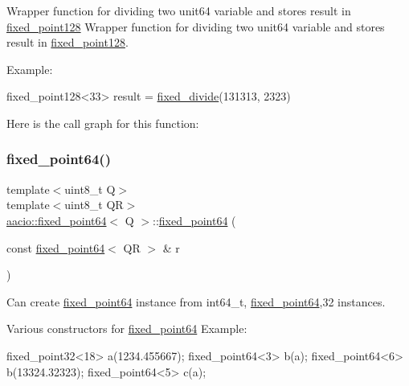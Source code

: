 Wrapper function for dividing two unit64 variable and stores result in \mbox{\hyperlink{structaacio_1_1fixed__point128}{fixed\+\_\+point128}} Wrapper function for dividing two unit64 variable and stores result in \mbox{\hyperlink{structaacio_1_1fixed__point128}{fixed\+\_\+point128}}. 

Example\+: 
\begin{DoxyCode}
fixed\_point128<33> result = \mbox{\hyperlink{group__fixedpoint_ga605ac661acc42c361ed85c4398e880d0}{fixed\_divide}}(131313, 2323)
\end{DoxyCode}
 Here is the call graph for this function\+:
\mbox{\label{group__fixedpoint_ga998ecf508857149cd2782eed7683d327}} 
\subsubsection{\texorpdfstring{fixed\+\_\+point64()}{fixed\_point64()}}
{\footnotesize\ttfamily template$<$uint8\+\_\+t Q$>$ \\
template$<$uint8\+\_\+t QR$>$ \\
\mbox{\hyperlink{structaacio_1_1fixed__point64}{aacio\+::fixed\+\_\+point64}}$<$ Q $>$\+::\mbox{\hyperlink{structaacio_1_1fixed__point64}{fixed\+\_\+point64}} (\begin{DoxyParamCaption}\item[{const \mbox{\hyperlink{structaacio_1_1fixed__point64}{fixed\+\_\+point64}}$<$ QR $>$ \&}]{r }\end{DoxyParamCaption})}



Can create \mbox{\hyperlink{structaacio_1_1fixed__point64}{fixed\+\_\+point64}} instance from int64\+\_\+t, \mbox{\hyperlink{structaacio_1_1fixed__point64}{fixed\+\_\+point64}},32 instances. 

Various constructors for \mbox{\hyperlink{structaacio_1_1fixed__point64}{fixed\+\_\+point64}} Example\+: 
\begin{DoxyCode}
fixed\_point32<18> a(1234.455667);
fixed\_point64<3> b(a);
fixed\_point64<6> b(13324.32323);
fixed\_point64<5> c(a);
\end{DoxyCode}
 \mbox{\label{group__fixedpoint_ga21d919b0487e65e733c35adb41848a34}} 
